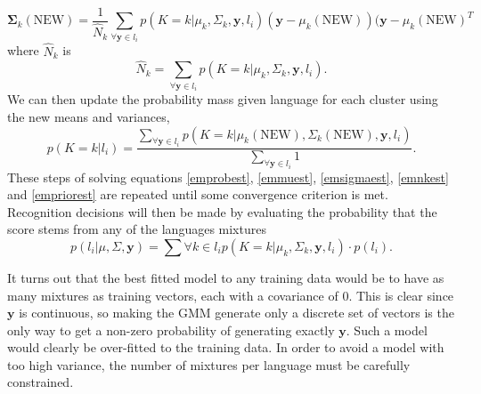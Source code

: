 \begin{equation}
\label{emsigmaest}
\mathbf{\Sigma}_k(\text{NEW}) = \frac{1}{\hat{N}_k}\sum_{\forall \mathbf{y} \in l_i} p(K=k | \mu_k, \Sigma_k, \mathbf{y}, l_i)(\mathbf{y}-\mu_k(\text{NEW}))(\mathbf{y}-\mu_k(\text{NEW})^T
\end{equation}
where $\hat{N}_k$ is 
\begin{equation}
\label{emnkest}
\hat{N}_k = \sum_{\forall \mathbf{y} \in l_i} p(K=k | \mu_k, \Sigma_k, \mathbf{y}, l_i).
\end{equation}
We can then update the probability mass given language for each cluster using the new means and variances,
\begin{equation}
\label{empriorest}
p(K=k | l_i) = \frac{\sum_{\forall \mathbf{y} \in l_i}p(K=k | \mu_k(\text{NEW}), \Sigma_k(\text{NEW}), \mathbf{y}, l_i)}{\sum_{\forall \mathbf{y} \in l_i} 1}.
\end{equation}
These steps of solving equations \ref{emprobest}, \ref{emmuest}, \ref{emsigmaest}, \ref{emnkest} and \ref{empriorest} are repeated until some convergence criterion is met. Recognition decisions will then be made by evaluating the probability that the score stems from any of the languages mixtures
\begin{equation}
\label{emgmmchoose}
p(l_i | \mu, \Sigma, \mathbf{y}) = \sum{\forall k \in l_i} p(K=k | \mu_k, \Sigma_k, \mathbf{y}, l_i)\cdot p(l_i).
\end{equation}

It turns out that the best fitted model to any training data would be to have as many mixtures as training vectors, each with a covariance of 0. This is clear since $\mathbf{y}$ is continuous, so making the GMM generate only a discrete set of vectors is the only way to get a non-zero probability of generating exactly $\mathbf{y}$. Such a model would clearly be over-fitted to the training data. In order to avoid a model with too high variance, the number of mixtures per language must be carefully constrained.
